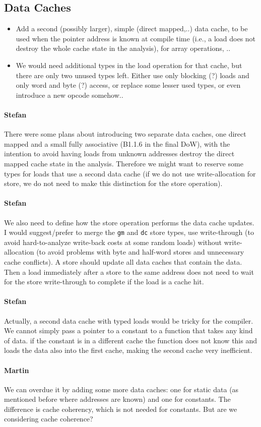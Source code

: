 \documentclass{IEEEtran}
\newcommand{\comment}[3]{\paragraph*{\textbf{#1}}{\color{#3}#2}}
\newcommand{\martin}[1]{\comment{Martin}{#1}{Blue}}
\newcommand{\stefan}[1]{\comment{Stefan}{#1}{RoyalPurple}}
\begin{document}
\subsection{Data Caches}

\begin{itemize}
  \item Add a second (possibly larger), simple (direct mapped,..) data cache, to be used when the pointer address is known at compile time
    (i.e., a load does not destroy the whole cache state in the analysis), for array operations, ..
  \item We would need additional types in the load operation for that cache, but there are only two unused types left. Either use only
    blocking (?) loads and only word and byte (?) access, or replace some lesser used types, or even introduce a new opcode somehow..
\end{itemize}

\stefan{There were some plans about introducing two separate data caches, one direct mapped and a small fully associative (B1.1.6
in the final DoW), with the intention to avoid having loads from unknown addresses destroy the direct mapped cache state in the analysis.
Therefore we might want to reserve some types for loads that use a second data cache (if we do not use write-allocation for store, we do not need to make
this distinction for the store operation).}

\stefan{We also need to define how the store operation performs the data cache updates. I would suggest/prefer to merge the \texttt{gm} and
\texttt{dc} store types, use write-through (to avoid hard-to-analyze write-back costs at some random loads) without write-allocation (to
avoid problems with byte and half-word stores and unnecessary cache conflicts). A store should update all data caches that contain the data.
Then a load immediately after a store to the same address does not need to wait for the store write-through to complete if the load is a cache hit.}

\stefan{Actually, a second data cache with typed loads would be tricky for the compiler. We cannot simply pass a pointer to a constant to a
function that takes any kind of data. if the constant is in a different cache the function does not know this and loads the data also into
the first cache, making the second cache very inefficient.}

\martin{We can overdue it by adding some more data caches: one for
static data (as mentioned before where addresses are known) and one
for constants. The difference is cache coherency, which is not needed
for constants. But are we considering cache coherence?}
\end{document}
